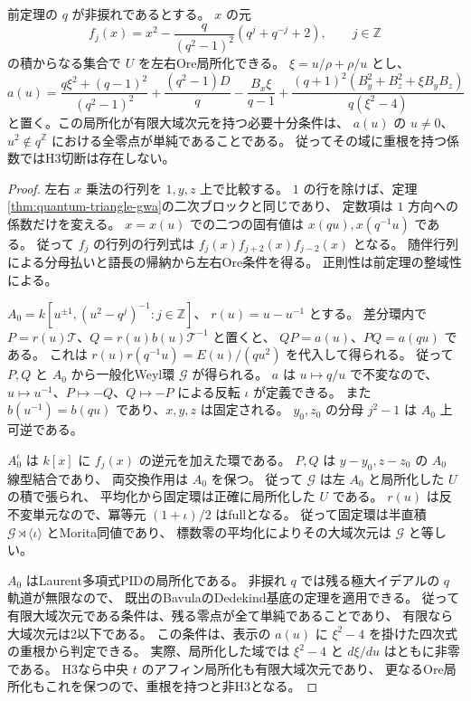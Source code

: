 \begin{proposition}\label{prop:cubic-CY-three-alpha-quantum-triangle-constants-gwa}
前定理の $q$ が非捩れであるとする。
$x$ の元
\[
 f_j(x)=x^2-\frac{q}{(q^2-1)^2}(q^j+q^{-j}+2),\qquad j\in\mathbb Z
\]
の積からなる集合で $U$ を左右Ore局所化できる。
$\xi=u/\rho+\rho/u$ とし、
\[
 a(u)=\frac{q\xi^2+(q-1)^2}{(q^2-1)^2}
       +\frac{(q^2-1)D}{q}-\frac{B_x\xi}{q-1}
       +\frac{(q+1)^2(B_y^2+B_z^2+\xi B_yB_z)}{q(\xi^2-4)}
\]
と置く。この局所化が有限大域次元を持つ必要十分条件は、
$a(u)$ の $u\ne0$、$u^2\notin q^{\mathbb Z}$ における全零点が単純であることである。
従ってその域に重根を持つ係数ではH3切断は存在しない。
\end{proposition}
\begin{proof}
左右 $x$ 乗法の行列を $1,y,z$ 上で比較する。
$1$ の行を除けば、定理\ref{thm:quantum-triangle-gwa}の二次ブロックと同じであり、
定数項は $1$ 方向への係数だけを変える。
$x=x(u)$ での二つの固有値は $x(qu),x(q^{-1}u)$ である。
従って $f_j$ の行列の行列式は
$f_j(x)f_{j+2}(x)f_{j-2}(x)$ となる。
随伴行列による分母払いと語長の帰納から左右Ore条件を得る。
正則性は前定理の整域性による。

$A_0=k[u^{\pm1},(u^2-q^j)^{-1}:j\in\mathbb Z]$、
$r(u)=u-u^{-1}$ とする。
差分環内で $P=r(u)\mathcal T$、$Q=r(u)b(u)\mathcal T^{-1}$ と置くと、
$QP=a(u)$、$PQ=a(qu)$ である。
これは $r(u)r(q^{-1}u)=E(u)/(q u^2)$ を代入して得られる。
従って $P,Q$ と $A_0$ から一般化Weyl環 $\mathcal G$ が得られる。
$a$ は $u\mapsto q/u$ で不変なので、
$u\mapsto u^{-1}$、$P\mapsto-Q$、$Q\mapsto-P$ による反転 $\iota$ が定義できる。
また $b(u^{-1})=b(qu)$ であり、$x,y,z$ は固定される。
$y_0,z_0$ の分母 $j^2-1$ は $A_0$ 上可逆である。

$A_0^\iota$ は $k[x]$ に $f_j(x)$ の逆元を加えた環である。
$P,Q$ は $y-y_0,z-z_0$ の $A_0$ 線型結合であり、
両交換作用は $A_0$ を保つ。
従って $\mathcal G$ は左 $A_0$ と局所化した $U$ の積で張られ、
平均化から固定環は正確に局所化した $U$ である。
$r(u)$ は反不変単元なので、冪等元 $(1+\iota)/2$ はfullとなる。
従って固定環は半直積 $\mathcal G\rtimes\langle\iota\rangle$ とMorita同値であり、
標数零の平均化によりその大域次元は $\mathcal G$ と等しい。

$A_0$ はLaurent多項式PIDの局所化である。
非捩れ $q$ では残る極大イデアルの $q$ 軌道が無限なので、
既出のBavulaのDedekind基底の定理\cite[Theorem 3.1]{BavulaGWAOverview}を適用できる。
従って有限大域次元である条件は、残る零点が全て単純であることであり、
有限なら大域次元は2以下である。
この条件は、表示の $a(u)$ に $\xi^2-4$ を掛けた四次式の重根から判定できる。
実際、局所化した域では $\xi^2-4$ と $d\xi/du$ はともに非零である。
H3なら中央 $t$ のアフィン局所化も有限大域次元であり、
更なるOre局所化もこれを保つので、重根を持つと非H3となる。
\end{proof}

